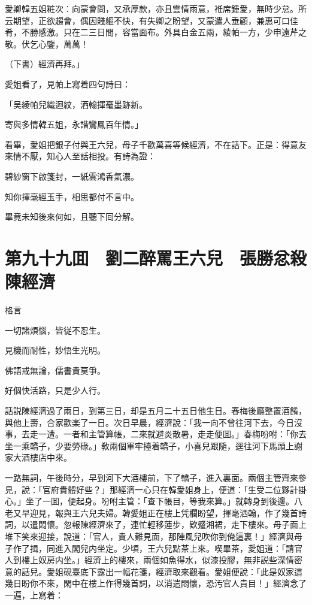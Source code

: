 愛卿韓五姐粧次：向蒙會問，又承厚款，亦且雲情雨意，袵席鍾愛，無時少怠。所云期望，正欲趨會，偶因賤軀不快，有失卿之盼望，又蒙遣人垂顧，兼惠可口佳肴，不勝感激。只在二三日間，容當面布。外具白金五兩，綾帕一方，少申遠芹之敬。伏乞心鑒，萬萬！

（下書）經濟再拜。」

愛姐看了，見帕上寫着四句詩曰：

「吴綾帕兒織迴紋，洒翰揮毫墨跡新。

寄與多情韓五姐，永諧鸞鳳百年情。」

看畢，愛姐把銀子付與王六兒，母子千歡萬喜等候經濟，不在話下。正是：得意友來情不厭，知心人至話相投。有詩為證：

碧紗窗下啟箋封，一紙雲鴻香氣濃。

知你揮毫經玉手，相思都付不言中。

畢竟未知後來何如，且聽下囘分解。

\chapter*{第九十九囬　劉二醉罵王六兒　張勝忿殺陳經濟}

格言

一切諸煩惱，皆従不忍生。

見機而耐性，妙悟生光明。

佛語戒無論，儒書貴莫爭。

好個快活路，只是少人行。

話説陳經濟過了兩日，到第三日，却是五月二十五日他生日。春梅後廳整置酒餚，與他上壽，合家歡楽了一日。次日早晨，經濟說：「我一向不曾往河下去，今日沒事，去走一遭。一者和主管算帳，二來就避炎散暑，走走便囬。」春梅吩咐：「你去坐一乘轎子，少要勞碌。」敎兩個軍牢擡着轎子，小喜兒跟隨，逕往河下馬頭上謝家大酒樓店中來。

一路無詞，午後時分，早到河下大酒樓前，下了轎子，進入裏面。兩個主管齊來參見，說：「官府貴體好些？」那經濟一心只在韓愛姐身上，便道：「生受二位夥計掛心。」坐了一囬，便起身。吩咐主管：「查下帳目，等我來算。」就轉身到後邊。八老又早迎見，報與王六兒夫婦。韓愛姐正在樓上凭欄盼望，揮毫洒翰，作了幾首詩詞，以遣悶懷。忽報陳經濟來了，連忙輕移蓮步，欵蹙湘裙，走下樓來。母子面上堆下笑來迎接，說道：「官人，貴人難見面，那陣風兒吹你到俺這裏！」經濟與母子作了揖，同進入閣兒内坐定。少頃，王六兒點茶上來。喫畢茶，愛姐道：「請官人到樓上奴房内坐。」經濟上的樓來，兩個如魚得水，似漆投膠，無非説些深情密意的話兒。愛姐硯臺底下露出一幅花箋，經濟取來觀看。愛姐便說：「此是奴家這幾日盼你不來，閑中在樓上作得幾首詞，以消遣悶懷，恐汚官人貴目！」經濟念了一遍，上寫着：

